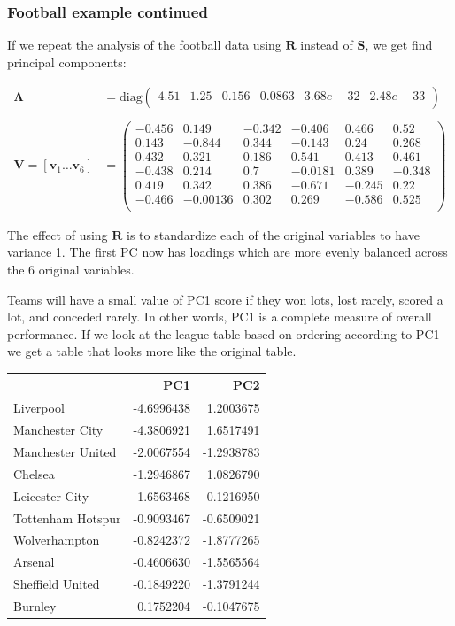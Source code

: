 \documentclass[]{book}
\theoremstyle{definition}
\theoremstyle{definition}
\theoremstyle{definition}
\theoremstyle{remark}
\begin{document}
\hypertarget{football-example-continued}{%
\subsubsection{Football example continued}\label{football-example-continued}}

If we repeat the analysis of the football data using \(\mathbf R\) instead of \(\mathbf S\), we get find principal components:

\begin{align*}
\boldsymbol \Lambda&= \text{diag}\begin{pmatrix}4.51&1.25&0.156&0.0863&3.68e-32&2.48e-33 \\\end{pmatrix}\\
\;\\
\mathbf V= [\mathbf v_1 \ldots \mathbf v_6] &=\begin{pmatrix}-0.456&0.149&-0.342&-0.406&0.466&0.52 \\0.143&-0.844&0.344&-0.143&0.24&0.268 \\0.432&0.321&0.186&0.541&0.413&0.461 \\-0.438&0.214&0.7&-0.0181&0.389&-0.348 \\0.419&0.342&0.386&-0.671&-0.245&0.22 \\-0.466&-0.00136&0.302&0.269&-0.586&0.525 \\\end{pmatrix}
\end{align*}

The effect of using \(\mathbf R\) is to standardize each of the original variables to have variance 1.
The first PC now has loadings which are more evenly balanced across the 6 original variables.

Teams will have a small value of PC1 score if they won lots, lost rarely, scored a lot, and conceded rarely. In other words, PC1 is a complete measure of overall performance. If we look at the league table based on ordering according to PC1 we get a table that looks more like the original table.

\begin{tabular}{lrr}
\toprule
  & PC1 & PC2\\
\midrule
Liverpool & -4.6996438 & 1.2003675\\
Manchester City & -4.3806921 & 1.6517491\\
Manchester United & -2.0067554 & -1.2938783\\
Chelsea & -1.2946867 & 1.0826790\\
Leicester City & -1.6563468 & 0.1216950\\
\addlinespace
Tottenham Hotspur & -0.9093467 & -0.6509021\\
Wolverhampton & -0.8242372 & -1.8777265\\
Arsenal & -0.4606630 & -1.5565564\\
Sheffield United & -0.1849220 & -1.3791244\\
Burnley & 0.1752204 & -0.1047675\\
\bottomrule
\end{tabular}
\end{document}
